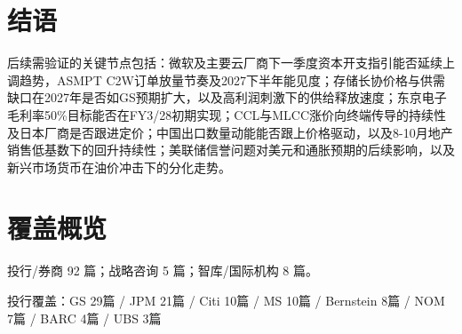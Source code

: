 \documentclass[11pt]{ctexart}
\begin{document}
\section{结语}
后续需验证的关键节点包括：微软及主要云厂商下一季度资本开支指引能否延续上调趋势，ASMPT C2W订单放量节奏及2027下半年能见度；存储长协价格与供需缺口在2027年是否如GS预期扩大，以及高利润刺激下的供给释放速度；东京电子毛利率50\%目标能否在FY3/28初期实现；CCL与MLCC涨价向终端传导的持续性及日本厂商是否跟进定价；中国出口数量动能能否跟上价格驱动，以及8-10月地产销售低基数下的回升持续性；美联储信誉问题对美元和通胀预期的后续影响，以及新兴市场货币在油价冲击下的分化走势。
\newpage
\section{覆盖概览}
投行/券商 92 篇；战略咨询 5 篇；智库/国际机构 8 篇。\par
投行覆盖：GS 29篇 / JPM 21篇 / Citi 10篇 / MS 10篇 / Bernstein 8篇 / NOM 7篇 / BARC 4篇 / UBS 3篇\par
\end{document}
